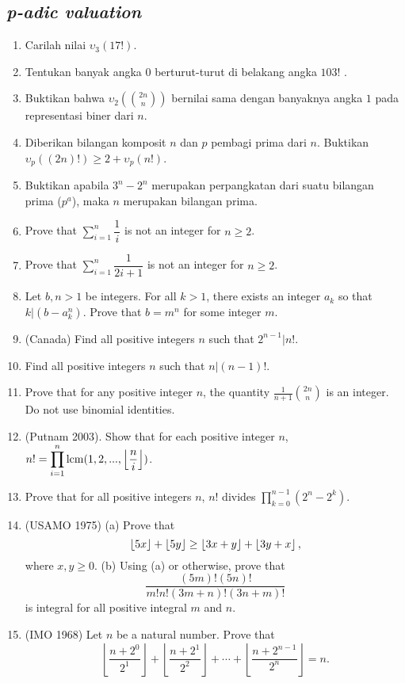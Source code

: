 \documentclass[11pt]{scrartcl}
\begin{document}
\subsection{\textit{p-adic valuation}}
\begin{enumerate}
    \item Carilah nilai $\upsilon_3(17!)$.
    \item Tentukan banyak angka 0 berturut-turut di belakang angka $103!$ .
    \item Buktikan bahwa $\upsilon_2(\binom{2n}{n})$ bernilai sama dengan banyaknya angka $1$ pada representasi biner dari $n$.
    \item Diberikan bilangan komposit $n$ dan $p$ pembagi prima dari $n$. Buktikan $\upsilon_p((2n)!) \geq 2+\upsilon_p(n!)$.
    \item Buktikan apabila $3^n-2^n$ merupakan perpangkatan dari suatu bilangan prima ($p^a$), maka $n$ merupakan bilangan prima.
    
    \item Prove that $\displaystyle\sum_{i=1}^{n} \dfrac{1}{i}$ is not an integer for $n \geq 2$.
    
    \item Prove that $\displaystyle\sum_{i=1}^{n} \dfrac{1}{2i+1}$ is not an integer for $n \geq 2$.
    
    \item Let $b, n > 1$ be integers. For all $k > 1$, there exists an integer $a_k$ so that $k | (b-a_k^n)$. Prove that $b = m^n$ for some integer $m$.
    
    \item (Canada) Find all positive integers $n$ such that $2^{n-1}|n!$.
    
    \item Find all positive integers $n$ such that $n | (n-1)!$.
    
    \item Prove that for any positive integer $n$, the quantity $\frac{1}{n+1}\binom{2n}{n}$ is an integer. Do not use binomial identities.
    
    \item (Putnam 2003). Show that for each positive integer $n$, $n! = \displaystyle\prod_{i=1}^n \operatorname{lcm}(1,2,...,\left\lfloor \frac{n}{i} \right\rfloor)$.
    
    \item Prove that for all positive integers $n$, $n!$ divides $\displaystyle\prod_{k=0}^{n-1} (2^n-2^k)$.
    
    \item (USAMO 1975) (a) Prove that \[ \left\lfloor 5x \right\rfloor+\left\lfloor 5y \right\rfloor \ge \left\lfloor 3x+y \right\rfloor+\left\lfloor 3y+x \right\rfloor,\] where $ x,y \ge 0$.
    (b) Using (a) or otherwise, prove that \[ \frac{(5m)!(5n)!}{m!n!(3m+n)!(3n+m)!}\] is integral for all positive integral $ m$ and $ n$. 

    \item (IMO 1968) Let $n$ be a natural number. Prove that\[ \left\lfloor \frac{n+2^0}{2^1} \right\rfloor + \left\lfloor \frac{n+2^1}{2^2} \right\rfloor +\cdots +\left\lfloor \frac{n+2^{n-1}}{2^n}\right\rfloor =n. \]
\end{enumerate}
\end{document}
